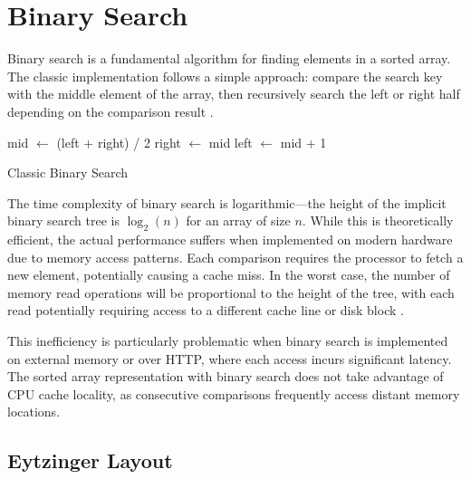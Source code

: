 
\section{Binary Search}
\label{tb:binary_search}

Binary search is a fundamental algorithm for finding elements in a sorted array. The classic implementation follows a simple approach: compare the search key with the middle element of the array, then recursively search the left or right half depending on the comparison result \citep{binary_search}.
\begin{algorithm}
  \BlankLine
  {
    mid $\leftarrow$ (left + right) / 2\;
    {
      right $\leftarrow$ mid\;
    }
    \Else
    {
      left $\leftarrow$ mid + 1\;
    }
  }
  \caption{Classic Binary Search}%
  \label{alg:binary_search}
\end{algorithm}

The time complexity of binary search is logarithmic—the height of the implicit binary search tree is $\log_2(n)$ for an array of size $n$. While this is theoretically efficient, the actual performance suffers when implemented on modern hardware due to memory access patterns. Each comparison requires the processor to fetch a new element, potentially causing a cache miss. In the worst case, the number of memory read operations will be proportional to the height of the tree, with each read potentially requiring access to a different cache line or disk block \citep{binary_search}.

This inefficiency is particularly problematic when binary search is implemented on external memory or over HTTP, where each access incurs significant latency. The sorted array representation with binary search does not take advantage of CPU cache locality, as consecutive comparisons frequently access distant memory locations.

\subsection{Eytzinger Layout}
\label{tb:eytzinger_layout}

